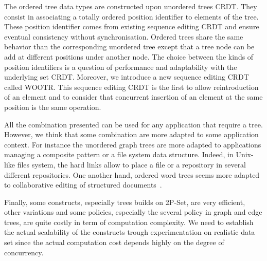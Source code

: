 \documentclass[a4paper]{article}
\begin{document}
The ordered tree data types are constructed upon unordered trees
CRDT. They consist in associating a totally ordered position
identifier to elements of the tree. These position identifier comes
from existing sequence editing CRDT and ensure eventual consistency
without synchronisation. Ordered trees share the same behavior than
the corresponding unordered tree except that a tree node can be add at
different positions under another node. The choice between the kinds
of position identifiers is a question of performance and adaptability
with the underlying set CRDT. Moreover, we introduce a new sequence
editing CRDT called WOOTR. This sequence editing CRDT is the first to
allow reintroduction of an element and to consider that concurrent
insertion of an element at the same position is the same operation.

All the combination presented can be used for any application that
require a tree. However, we think that some combination are more
adapted to some application context. For instance the unordered graph
trees are more adapted to applications managing a composite pattern or
a file system data structure. Indeed, in Unix-like files system, the
hard links allow to place a file or a repository in several different
repositories. One another hand, ordered word trees seems more adapted
to collaborative editing of structured
documents~\cite{martin10scalable}.

Finally, some constructs, especially trees builds on 2P-Set, are very
efficient, other variations and some policies, especially the several
policy in graph and edge trees, are quite costly in term of
computation complexity. We need to establish the actual scalability of
the constructs trough experimentation on realistic data set since the
actual computation cost depends highly on the degree of concurrency.



\end{document}
